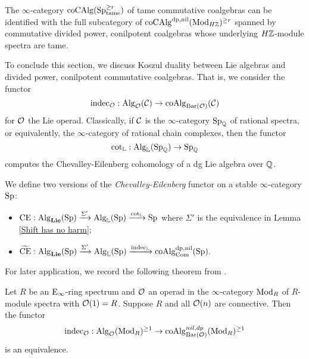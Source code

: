 \begin{remark}
\label{Identification of tame commutative coalgebras in Mod_HZ}
    The $\infty$-category $\operatorname{coCAlg}(\operatorname{Sp}^{\geq r}_{\operatorname{\operatorname{tame}}})$ of tame commutative coalgebras can be identified with the full subcategory of $\operatorname{coCAlg}^{\operatorname{dp}, \operatorname{nil}}(\operatorname{Mod}_{H{\mathbb{Z}}})^{\geq r}$ spanned by commutative divided power, conilpotent coalgebras whose underlying $H{\mathbb{Z}}$-module spectra are tame.
\end{remark}


To conclude this section,
we discuss Koszul duality between Lie algebras and divided power, conilpotent commutative coalgebras.
That is, we consider the functor
$$\operatorname{indec}_{{\mathcal{O}}}: \operatorname{Alg}_{{\mathcal{O}}}({\mathcal{C}})\to \operatorname{coAlg}_{\operatorname{Bar}({\mathcal{O}})}({\mathcal{C}})$$
for ${\mathcal{O}}$ the Lie operad. 
Classically, if ${\mathcal{C}}$ is the $\infty$-category $\operatorname{Sp}_{{\mathbb{Q}}}$ of rational spectra, or equivalently, the $\infty$-category of rational chain complexes, then the functor 
$$
\cot_{{\mathbb{L}}}: \operatorname{Alg}_{{\mathbb{L}}}(\operatorname{Sp}_{{\mathbb{Q}}}) 
\to 
\operatorname{Sp}_{{\mathbb{Q}}}
$$
computes the Chevalley-Eilenberg cohomology of a dg Lie algebra over ${\mathbb{Q}}$. 

\begin{definition}
\label{CChevalley-Eilenberg functor}
  We define two versions of the \emph{Chevalley-Eilenberg} functor on a stable $\infty$-category $\operatorname{Sp}$:
    \begin{itemize}
        \item  
        $
        \operatorname{CE}: \operatorname{Alg}_{\mathbf{Lie}}(\operatorname{Sp})\xrightarrow{\Sigma'} \operatorname{Alg}_{{\mathbb{L}}}(\operatorname{Sp})
        \xrightarrow{\cot_{{\mathbb{L}}}}
        \operatorname{Sp}
        $
        where $\Sigma'$ is the equivalence in Lemma \ref{Shift has no harm};
        \item $
        \widetilde{\operatorname{CE}}: \operatorname{Alg}_{\mathbf{Lie}}(\operatorname{Sp})\xrightarrow{\Sigma'} \operatorname{Alg}_{{\mathbb{L}}}(\operatorname{Sp})
        \xrightarrow{\operatorname{indec}_{{\mathbb{L}}}}
        \operatorname{coAlg}^{\operatorname{dp}, \operatorname{nil}}_{\operatorname{Com}}(\operatorname{Sp}).
        $
    \end{itemize}
\end{definition}

For later application, we record the following theorem from \cite{Ching-Harper}.
\begin{theorem}
\cite{Ching-Harper}
\label{Ching-Harper's Koszul duality}
	Let $R$ be an $\operatorname{E}_{\infty}$-ring spectrum and ${\mathcal{O}}$ an operad in the $\infty$-category $\operatorname{Mod}_R$ of $R$-module spectra with ${\mathcal{O}}(1)=R$. Suppose $R$ and all ${\mathcal{O}}(n)$ are connective. Then the functor 
	\[
	\operatorname{indec}_{{\mathcal{O}}}: \operatorname{Alg}_{{\mathcal{O}}}(\operatorname{Mod}_R)^{\geq 1} \to \operatorname{coAlg}^{nil, dp}_{\operatorname{Bar}({\mathcal{O}})}(\operatorname{Mod}_R)^{\geq 1}
	\]
	 is an equivalence.
\end{theorem}

